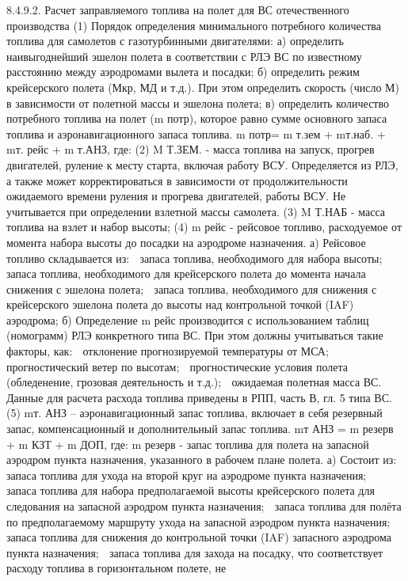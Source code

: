 8.4.9.2. Расчет заправляемого топлива на полет для ВС отечественного производства
(1) Порядок определения минимального потребного количества топлива для самолетов с газотурбинными двигателями:
а)	определить наивыгоднейший эшелон полета в соответствии с РЛЭ ВС по известному расстоянию между аэродромами вылета и посадки;
б)	определить режим крейсерского полета (Мкр, МД и т.д.). При этом определить скорость (число М) в зависимости от полетной массы и эшелона полета;
в)	определить количество потребного топлива на полет (m потр), которое равно сумме основного запаса топлива и аэронавигационного запаса топлива. 
m потр= m т.зем + mт.наб. + mт. рейс + m т.АНЗ, где:
(2) M Т.ЗЕМ. - масса топлива на запуск, прогрев двигателей, руление к месту старта, включая работу ВСУ. Определяется из РЛЭ, а также может корректироваться в зависимости от продолжительности ожидаемого времени руления и прогрева двигателей, работы ВСУ.
Не учитывается при определении взлетной массы самолета.
(3) M Т.НАБ - масса топлива на взлет и набор высоты;
(4) m рейс - рейсовое топливо, расходуемое от момента набора высоты до посадки на аэродроме назначения. 
а)	Рейсовое топливо складывается из:
	запаса топлива, необходимого для набора высоты;
	запаса топлива, необходимого для крейсерского полета до момента начала снижения с эшелона полета;
	запаса топлива, необходимого для снижения с крейсерского эшелона полета до высоты над контрольной точкой (IAF) аэродрома;
б)	Определение m рейс производится с использованием таблиц (номограмм) РЛЭ конкретного типа ВС.
При этом должны учитываться такие факторы, как:
	отклонение прогнозируемой температуры от МСА;
	прогностический ветер по высотам;
	прогностические условия полета (обледенение, грозовая деятельность и т.д.);
	ожидаемая полетная масса ВС.
Данные для расчета расхода топлива приведены в РПП, часть В, гл. 5 типа ВС.
(5) mт. АНЗ – аэронавигационный запас топлива, включает в себя резервный запас, компенсационный и дополнительный запас топлива.
mт АНЗ = m резерв + m КЗТ + m ДОП, где:
m резерв - запас топлива для полета на запасной аэродром пункта назначения, указанного в рабочем плане полета.
а)	Состоит из: 
	запаса топлива для ухода на второй круг на аэродроме пункта назначения;
	запаса топлива для набора предполагаемой высоты крейсерского полета для следования на запасной 
аэродром пункта назначения;
	запаса топлива для полёта по предполагаемому маршруту ухода на запасной аэродром пункта назначения;
	запаса топлива для снижения до контрольной точки (IAF) запасного аэродрома пункта назначения;
	запаса топлива для захода на посадку, что соответствует расходу топлива в горизонтальном полете, не
